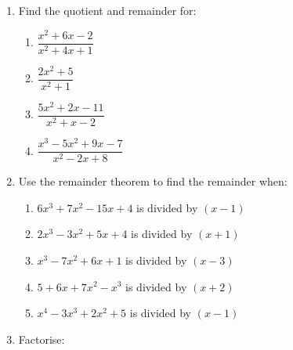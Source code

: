\documentclass[
  english,
  12pt,
  oneside]{book}
\providecommand{\tightlist}{%
  \setlength{\itemsep}{0pt}\setlength{\parskip}{0pt}}
\theoremstyle{definition}
\theoremstyle{definition}
\theoremstyle{definition}
\theoremstyle{definition}
\theoremstyle{remark}
\begin{document}
\begin{enumerate}
  \begin{enumerate}
  \def\labelenumii{\alph{enumii})}
  \tightlist
  \item
    \(x^3 + 2x^2 – x – 2\) divided by \(x – 1\)
  \item
    \(2x^3 + 9x^2 – 4x – 21\) divided by \(2x – 3\)
  \item
    \(x^4 + x^3 + 7x – 3\) divided by \(x^2 – x + 3\)
  \item
    \(6x^4 + 14x^3 – 9x^2 – 7x + 3\) divided by \(2x^2 – 1\)
  \end{enumerate}
\item
  Find the quotient and remainder for:

  \begin{enumerate}
  \def\labelenumii{\alph{enumii})}
  \tightlist
  \item
    \(\dfrac{x^2+6x-2}{x^2+4x+1}\)
  \item
    \(\dfrac{2x^2+5}{x^2+1}\)
  \item
    \(\dfrac{5x^2+2x-11}{x^2+x-2}\)
  \item
    \(\dfrac{x^3-5x^2+9x-7}{x^2-2x+8}\)
  \end{enumerate}
\item
  Use the remainder theorem to find the remainder when:

  \begin{enumerate}
  \def\labelenumii{\alph{enumii})}
  \tightlist
  \item
    \(6x^3 + 7x^2 - 15x + 4\) is divided by \((x - 1)\)
  \item
    \(2x^3 - 3x^2 + 5x + 4\) is divided by \((x + 1)\)
  \item
    \(x^3 - 7x^2 + 6x + 1\) is divided by \((x - 3)\)
  \item
    \(5 + 6x + 7x^2 - x^3\) is divided by \((x + 2)\)
  \item
    \(x^4 - 3x^3 + 2x^2 + 5\) is divided by \((x - 1)\)
  \end{enumerate}
\item
  Factorise:


\end{enumerate}
\end{document}
